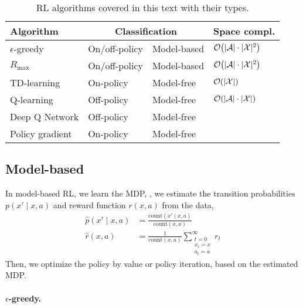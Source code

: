 \begin{table}[t]
  \caption{RL algorithms covered in this text with their types.}
  \label{tab:rl-algos}
  \centering
  \begin{tabular}[c]{llll}
    \toprule
    \textbf{Algorithm} & \multicolumn{2}{c}{\textbf{Classification}} & \textbf{Space compl.} \\
    \midrule
    $\epsilon$-greedy & On/off-policy & Model-based & $\bigo{|\mathcal{A}| \cdot |\X|^2}$ \\
    $R_{\max}$ & On/off-policy & Model-based & $\bigo{|\mathcal{A}| \cdot |\X|^2}$ \\
    TD-learning & On-policy & Model-free & $\bigo{|\X|}$ \\
    Q-learning & Off-policy & Model-free & $\bigo{|\mathcal{A}| \cdot |\X|}$ \\
    Deep Q Network & Off-policy & Model-free \\
    Policy gradient & On-policy & Model-free \\
    \bottomrule
  \end{tabular}
\end{table}

\subsection{Model-based}

In model-based RL, we learn the MDP, \ie, we estimate the transition
probabilities $p(x'\mid x,a)$ and reward function $r(x,a)$ from the data,
\begin{align*}
  \hat{p}(x'\mid x, a) &= \frac{\mathrm{count}(x' \mid x, a)}{\mathrm{count}(x, a)} \\
  \hat{r}(x, a) &= \frac{1}{\mathrm{count}(x,a)} \sum_{\substack{t=0 \\ x_t = x \\ a_t = a}}^\infty r_t
\end{align*}
Then, we optimize the policy by value or policy iteration, based on the
estimated MDP.

\paragraph{$\epsilon$-greedy.}


